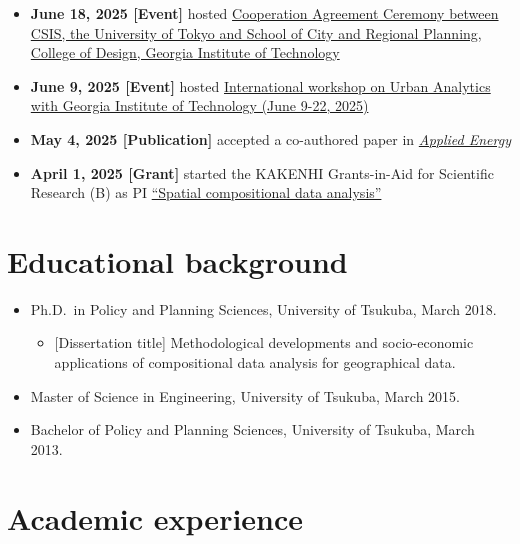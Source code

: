 \documentclass[
]{book}
\providecommand{\tightlist}{%
  \setlength{\itemsep}{0pt}\setlength{\parskip}{0pt}}
\begin{document}
\begin{itemize}
\item
  \textbf{June 18, 2025 {[}Event{]}} hosted \href{https://www.csis.u-tokyo.ac.jp/news/georgia_tech_agreement_ceremony_202506/}{Cooperation Agreement Ceremony between CSIS, the University of Tokyo and School of City and Regional Planning, College of Design, Georgia Institute of Technology}
\item
  \textbf{June 9, 2025 {[}Event{]}} hosted \href{https://www.csis.u-tokyo.ac.jp/news/georgia_yang_workshop_202506/}{International workshop on Urban Analytics with Georgia Institute of Technology (June 9-22, 2025)}
\item
  \textbf{May 4, 2025 {[}Publication{]}} accepted a co-authored paper in \href{https://www.sciencedirect.com/science/article/pii/S0306261925007974}{\emph{Applied Energy}}
\item
  \textbf{April 1, 2025 {[}Grant{]}} started the KAKENHI Grants-in-Aid for Scientific Research (B) as PI \href{https://kaken.nii.ac.jp/en/grant/KAKENHI-PROJECT-25K00624/}{``Spatial compositional data analysis''}
\end{itemize}

\section*{Educational background}\label{educational-background}

\begin{itemize}
\tightlist
\item
  Ph.D.~in Policy and Planning Sciences, University of Tsukuba, March 2018.

  \begin{itemize}
  \tightlist
  \item
    {[}Dissertation title{]} Methodological developments and socio-economic applications of compositional data analysis for geographical data.
  \end{itemize}
\item
  Master of Science in Engineering, University of Tsukuba, March 2015.
\item
  Bachelor of Policy and Planning Sciences, University of Tsukuba, March 2013.
\end{itemize}

\section*{Academic experience}\label{academic-experience}
\end{document}
